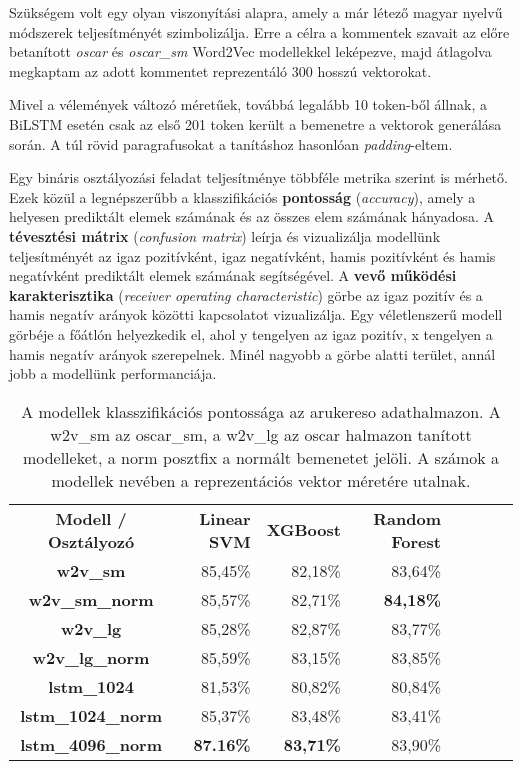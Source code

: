 Szükségem volt egy olyan viszonyítási alapra, amely a már létező magyar nyelvű módszerek teljesítményét szimbolizálja. Erre a célra a kommentek szavait az előre betanított \textit{oscar} és \textit{oscar\_sm} Word2Vec modellekkel leképezve, majd átlagolva megkaptam az adott kommentet reprezentáló 300 hosszú vektorokat.

Mivel a vélemények változó méretűek, továbbá legalább 10 token-ből állnak, a BiLSTM esetén csak az első 201 token került a bemenetre a vektorok generálása során. A túl rövid paragrafusokat a tanításhoz hasonlóan \textit{padding}-eltem.

Egy bináris osztályozási feladat teljesítménye többféle metrika szerint is mérhető. Ezek közül a legnépszerűbb a klasszifikációs \textbf{pontosság} (\textit{accuracy}), amely a helyesen prediktált elemek számának és az összes elem számának hányadosa. A \textbf{tévesztési mátrix} (\textit{confusion matrix}) leírja és vizualizálja modellünk teljesítményét az igaz pozitívként, igaz negatívként, hamis pozitívként és hamis negatívként prediktált elemek számának segítségével. A \textbf{vevő működési karakterisztika} (\textit{receiver operating characteristic}) görbe az igaz pozitív és a hamis negatív arányok közötti kapcsolatot vizualizálja. Egy véletlenszerű modell görbéje a főátlón helyezkedik el, ahol y tengelyen az igaz pozitív, x tengelyen a hamis negatív arányok szerepelnek. Minél nagyobb a görbe alatti terület, annál jobb a modellünk performanciája.

\begin{table}[H]
	\centering
	\begin{tabular}{ | c | r | r | r | r | r | r | r |}
		\hline
		\multirow{2}{*}{\textbf{Modell / Osztályozó}} & \multirow{2}{*}{\textbf{Linear SVM}} & \multirow{2}{*}{\textbf{XGBoost}} & \multirow{2}{*}{\textbf{Random Forest}} \\
		& & & \\
		\hline \hline		
		\textbf{w2v\_sm} & 85,45\% & 82,18\% & 83,64\% \\
		\hline
		\textbf{w2v\_sm\_norm} & 85,57\% & 82,71\% & \textbf{84,18\%} \\
		\hline
		\textbf{w2v\_lg} & 85,28\% & 82,87\% & 83,77\% \\
		\hline
		\textbf{w2v\_lg\_norm} & 85,59\% & 83,15\% & 83,85\% \\
		\hline  
		\textbf{lstm\_1024} & 81,53\% & 80,82\% & 80,84\% \\
		\hline  
		\textbf{lstm\_1024\_norm} & 85,37\% & 83,48\% & 83,41\% \\
		\hline
		\textbf{lstm\_4096\_norm} & \textbf{87.16\%} & \textbf{83,71\%} & 83,90\% \\
		\hline
	\end{tabular}
	\caption[A modellek pontossága]{A modellek klasszifikációs pontossága az arukereso adathalmazon. A w2v\_sm az oscar\_sm, a w2v\_lg az oscar halmazon tanított modelleket, a norm posztfix a normált bemenetet jelöli. A számok a modellek nevében a reprezentációs vektor méretére utalnak.}
	\label{tab:evaluation}
\end{table}

